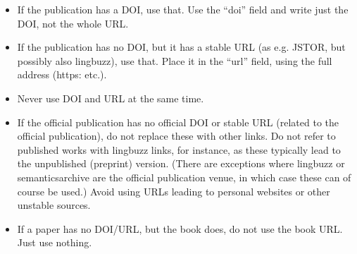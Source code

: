 \begin{itemize}
    \item If the publication has a DOI, use that. Use the ``doi'' field and write just the DOI, not the whole URL.
    \item If the publication has no DOI, but it has a stable URL (as e.g. JSTOR, but possibly also lingbuzz), use that. Place it in the ``url'' field, using the full address (https: etc.).
    \item Never use DOI and URL at the same time.
    \item If the official publication has no official DOI or stable URL (related to the official publication), do not replace these with other links. Do not refer to published works with lingbuzz links, for instance, as these typically lead to the unpublished (preprint) version. (There are exceptions where lingbuzz or semanticsarchive are the official publication venue, in which case these can of course be used.) Avoid using URLs leading to personal websites or other unstable sources.
    \item If a paper has no DOI/URL, but the book does, do not use the book URL. Just use nothing.
\end{itemize}